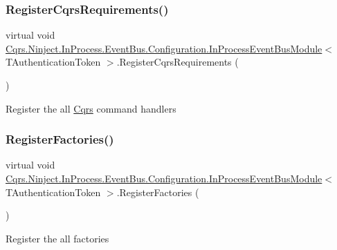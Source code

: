 \subsubsection{\texorpdfstring{Register\+Cqrs\+Requirements()}{RegisterCqrsRequirements()}}
{\footnotesize\ttfamily virtual void \hyperlink{classCqrs_1_1Ninject_1_1InProcess_1_1EventBus_1_1Configuration_1_1InProcessEventBusModule}{Cqrs.\+Ninject.\+In\+Process.\+Event\+Bus.\+Configuration.\+In\+Process\+Event\+Bus\+Module}$<$ T\+Authentication\+Token $>$.Register\+Cqrs\+Requirements (\begin{DoxyParamCaption}{ }\end{DoxyParamCaption})\hspace{0.3cm}{\ttfamily [virtual]}}



Register the all \hyperlink{namespaceCqrs}{Cqrs} command handlers 

\mbox{\label{classCqrs_1_1Ninject_1_1InProcess_1_1EventBus_1_1Configuration_1_1InProcessEventBusModule_a2fddbdd70a085bbbe1647a2d280e32e4}} 
\subsubsection{\texorpdfstring{Register\+Factories()}{RegisterFactories()}}
{\footnotesize\ttfamily virtual void \hyperlink{classCqrs_1_1Ninject_1_1InProcess_1_1EventBus_1_1Configuration_1_1InProcessEventBusModule}{Cqrs.\+Ninject.\+In\+Process.\+Event\+Bus.\+Configuration.\+In\+Process\+Event\+Bus\+Module}$<$ T\+Authentication\+Token $>$.Register\+Factories (\begin{DoxyParamCaption}{ }\end{DoxyParamCaption})\hspace{0.3cm}{\ttfamily [virtual]}}



Register the all factories 

